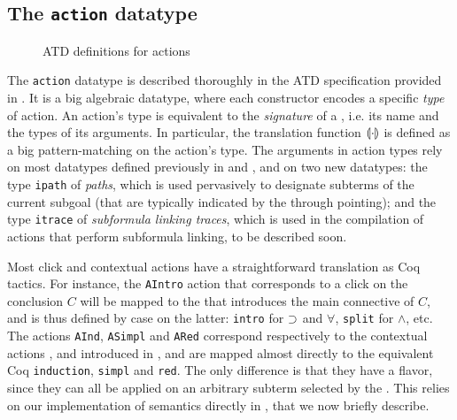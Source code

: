 \subsection{The \texttt{action} datatype}

\begin{figure}
  
  \caption{ATD definitions for actions}
\end{figure}

The \texttt{action} datatype is described thoroughly in the ATD specification
provided in . It is a big algebraic datatype, where each
constructor encodes a specific \emph{type} of action. An action's type is
equivalent to the \emph{signature} of a , i.e. its name and the types of
its arguments. In particular, the translation function $\llparenthesis \cdot \rrparenthesis$ is
defined as a big pattern-matching on the action's type. The arguments in action types rely
on most datatypes defined previously in  and ,
and on two new datatypes: the type \texttt{ipath} of \emph{paths}, which is used
pervasively to designate subterms of the current subgoal (that are typically
indicated by the  through pointing); and the type \texttt{itrace}
of \emph{subformula linking traces}, which is used in the compilation of 
actions that perform subformula linking, to be described soon.

Most click and contextual actions have a straightforward translation as Coq
tactics. For instance, the \texttt{AIntro} action that corresponds to a click on
the conclusion $C$ will be mapped to the   that introduces the main
connective of $C$, and is thus defined by case on the latter: \texttt{intro} for
$\supset$ and $\forall$, \texttt{split} for $\land$, etc. The actions
\texttt{AInd}, \texttt{ASimpl} and \texttt{ARed} correspond respectively to the
contextual actions ,  and 
introduced in , and are mapped almost directly to the equivalent
Coq  \texttt{induction}, \texttt{simpl} and \texttt{red}. The only
difference is that they have a \emph{} flavor, since they can all
be applied on an arbitrary subterm selected by the . This relies
on our implementation of  semantics directly in , that we now
briefly describe.

